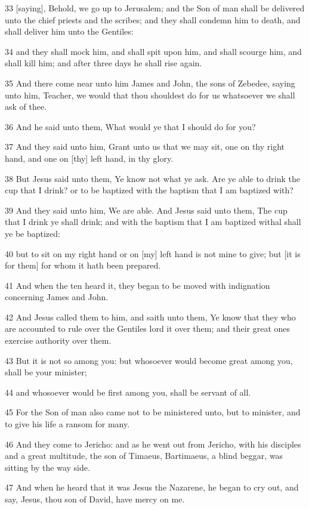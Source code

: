 \par 33 [saying], Behold, we go up to Jerusalem; and the Son of man shall be delivered unto the chief priests and the scribes; and they shall condemn him to death, and shall deliver him unto the Gentiles:
\par 34 and they shall mock him, and shall spit upon him, and shall scourge him, and shall kill him; and after three days he shall rise again.
\par 35 And there come near unto him James and John, the sons of Zebedee, saying unto him, Teacher, we would that thou shouldest do for us whatsoever we shall ask of thee.
\par 36 And he said unto them, What would ye that I should do for you?
\par 37 And they said unto him, Grant unto us that we may sit, one on thy right hand, and one on [thy] left hand, in thy glory.
\par 38 But Jesus said unto them, Ye know not what ye ask. Are ye able to drink the cup that I drink? or to be baptized with the baptism that I am baptized with?
\par 39 And they said unto him, We are able. And Jesus said unto them, The cup that I drink ye shall drink; and with the baptism that I am baptized withal shall ye be baptized:
\par 40 but to sit on my right hand or on [my] left hand is not mine to give; but [it is for them] for whom it hath been prepared.
\par 41 And when the ten heard it, they began to be moved with indignation concerning James and John.
\par 42 And Jesus called them to him, and saith unto them, Ye know that they who are accounted to rule over the Gentiles lord it over them; and their great ones exercise authority over them.
\par 43 But it is not so among you: but whosoever would become great among you, shall be your minister;
\par 44 and whosoever would be first among you, shall be servant of all.
\par 45 For the Son of man also came not to be ministered unto, but to minister, and to give his life a ransom for many.
\par 46 And they come to Jericho: and as he went out from Jericho, with his disciples and a great multitude, the son of Timaeus, Bartimaeus, a blind beggar, was sitting by the way side.
\par 47 And when he heard that it was Jesus the Nazarene, he began to cry out, and say, Jesus, thou son of David, have mercy on me.
